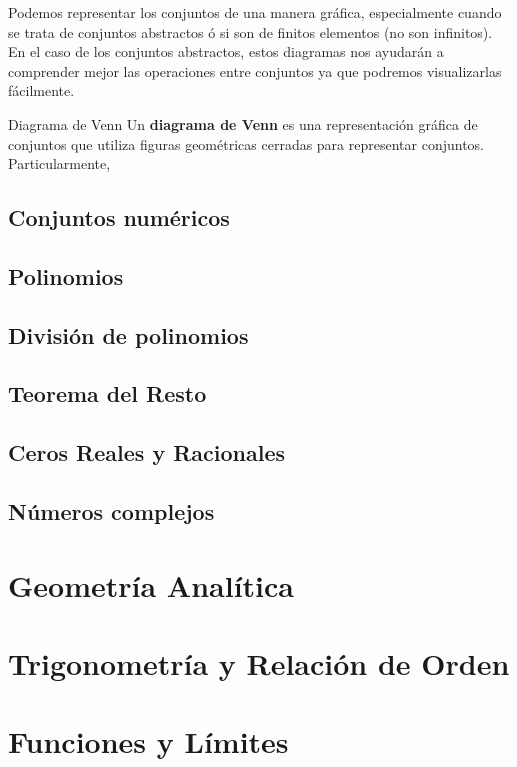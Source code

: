 \documentclass[12pt, twoside]{book}
\begin{document}
Podemos representar los conjuntos de una manera gráfica, especialmente cuando se trata de conjuntos abstractos ó si son de finitos elementos (no son infinitos). En el caso de los conjuntos abstractos, estos diagramas nos ayudarán a comprender mejor las operaciones entre conjuntos ya que podremos visualizarlas fácilmente.

\begin{definition}{Diagrama de Venn}
    Un \textbf{diagrama de Venn} es una representación gráfica de conjuntos que utiliza figuras geométricas cerradas para representar conjuntos. Particularmente,
\end{definition}

\section{Conjuntos numéricos}

\section{Polinomios}

\section{División de polinomios}
\section{Teorema del Resto}
\section{Ceros Reales y Racionales}

\section{Números complejos}

\chapter{Geometría Analítica}

\chapter{Trigonometría y Relación de Orden}

\chapter{Funciones y Límites}



\printindex

\begin{titlepage}

    \makebox[0pt][l]{\rule{1.3\textwidth}{0pt}}
    \par
    \pagecolor{ustmidgreen}

    \noindent
\end{titlepage}

\nopagecolor
\end{document}
